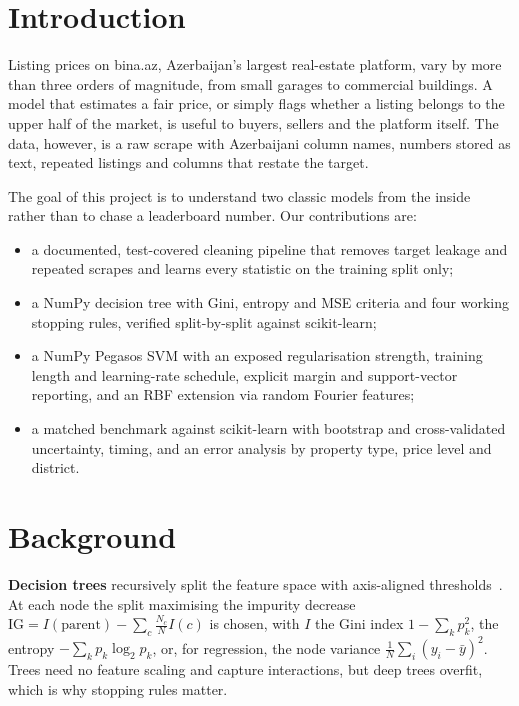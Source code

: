 \documentclass[10pt,twocolumn,a4paper]{article}
\begin{document}
\section{Introduction}
Listing prices on bina.az, Azerbaijan's largest real-estate platform,
vary by more than three orders of magnitude, from small garages to
commercial buildings. A model that estimates a fair price, or simply flags
whether a listing belongs to the upper half of the market, is useful to
buyers, sellers and the platform itself. The data, however, is a raw scrape
with Azerbaijani column names, numbers stored as text, repeated listings and
columns that restate the target.

The goal of this project is to understand two classic models from the
inside rather than to chase a leaderboard number. Our contributions are:
\begin{itemize}
  \setlength\itemsep{0pt}
  \item a documented, test-covered cleaning pipeline that removes target
        leakage and repeated scrapes and learns every statistic on the
        training split only;
  \item a NumPy decision tree with Gini, entropy and MSE criteria and four
        working stopping rules, verified split-by-split against
        scikit-learn;
  \item a NumPy Pegasos SVM with an exposed regularisation strength,
        training length and learning-rate schedule, explicit margin and
        support-vector reporting, and an RBF extension via random Fourier
        features;
  \item a matched benchmark against scikit-learn with bootstrap and
        cross-validated uncertainty, timing, and an error analysis by
        property type, price level and district.
\end{itemize}

\section{Background}
\textbf{Decision trees} recursively split the feature space with
axis-aligned thresholds~\cite{breiman}. At each node the split maximising
the impurity decrease
$\mathrm{IG}=I(\text{parent})-\sum_c \frac{N_c}{N} I(c)$ is chosen, with
$I$ the Gini index $1-\sum_k p_k^2$, the entropy $-\sum_k p_k\log_2 p_k$,
or, for regression, the node variance $\frac1N\sum_i(y_i-\bar y)^2$.
Trees need no feature scaling and capture interactions, but deep trees
overfit, which is why stopping rules matter.
\end{document}
